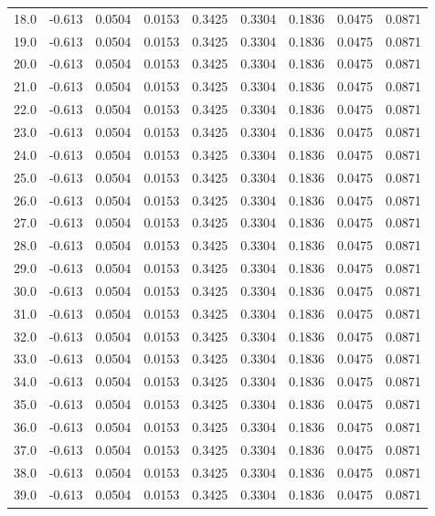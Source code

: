 \begin{longtable}{lrrrrrrrr}
18.0 & -0.613 & 0.0504 & 0.0153 & 0.3425 & 0.3304 & 0.1836 & 0.0475 & 0.0871 \\
19.0 & -0.613 & 0.0504 & 0.0153 & 0.3425 & 0.3304 & 0.1836 & 0.0475 & 0.0871 \\
20.0 & -0.613 & 0.0504 & 0.0153 & 0.3425 & 0.3304 & 0.1836 & 0.0475 & 0.0871 \\
21.0 & -0.613 & 0.0504 & 0.0153 & 0.3425 & 0.3304 & 0.1836 & 0.0475 & 0.0871 \\
22.0 & -0.613 & 0.0504 & 0.0153 & 0.3425 & 0.3304 & 0.1836 & 0.0475 & 0.0871 \\
23.0 & -0.613 & 0.0504 & 0.0153 & 0.3425 & 0.3304 & 0.1836 & 0.0475 & 0.0871 \\
24.0 & -0.613 & 0.0504 & 0.0153 & 0.3425 & 0.3304 & 0.1836 & 0.0475 & 0.0871 \\
25.0 & -0.613 & 0.0504 & 0.0153 & 0.3425 & 0.3304 & 0.1836 & 0.0475 & 0.0871 \\
26.0 & -0.613 & 0.0504 & 0.0153 & 0.3425 & 0.3304 & 0.1836 & 0.0475 & 0.0871 \\
27.0 & -0.613 & 0.0504 & 0.0153 & 0.3425 & 0.3304 & 0.1836 & 0.0475 & 0.0871 \\
28.0 & -0.613 & 0.0504 & 0.0153 & 0.3425 & 0.3304 & 0.1836 & 0.0475 & 0.0871 \\
29.0 & -0.613 & 0.0504 & 0.0153 & 0.3425 & 0.3304 & 0.1836 & 0.0475 & 0.0871 \\
30.0 & -0.613 & 0.0504 & 0.0153 & 0.3425 & 0.3304 & 0.1836 & 0.0475 & 0.0871 \\
31.0 & -0.613 & 0.0504 & 0.0153 & 0.3425 & 0.3304 & 0.1836 & 0.0475 & 0.0871 \\
32.0 & -0.613 & 0.0504 & 0.0153 & 0.3425 & 0.3304 & 0.1836 & 0.0475 & 0.0871 \\
33.0 & -0.613 & 0.0504 & 0.0153 & 0.3425 & 0.3304 & 0.1836 & 0.0475 & 0.0871 \\
34.0 & -0.613 & 0.0504 & 0.0153 & 0.3425 & 0.3304 & 0.1836 & 0.0475 & 0.0871 \\
35.0 & -0.613 & 0.0504 & 0.0153 & 0.3425 & 0.3304 & 0.1836 & 0.0475 & 0.0871 \\
36.0 & -0.613 & 0.0504 & 0.0153 & 0.3425 & 0.3304 & 0.1836 & 0.0475 & 0.0871 \\
37.0 & -0.613 & 0.0504 & 0.0153 & 0.3425 & 0.3304 & 0.1836 & 0.0475 & 0.0871 \\
38.0 & -0.613 & 0.0504 & 0.0153 & 0.3425 & 0.3304 & 0.1836 & 0.0475 & 0.0871 \\
39.0 & -0.613 & 0.0504 & 0.0153 & 0.3425 & 0.3304 & 0.1836 & 0.0475 & 0.0871 \\

\end{longtable}
